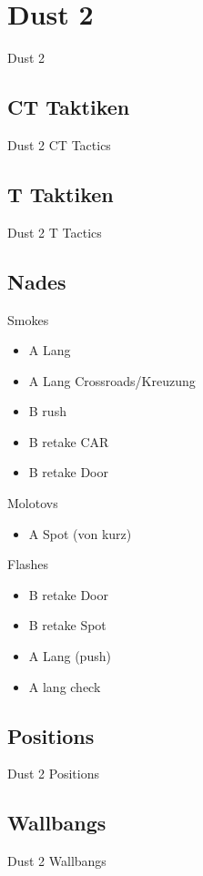 \newpage




\chapter{Dust 2}
\label{chap:dust2}
Dust 2

\section{CT Taktiken}
\label{sect:dust2_ct}
Dust 2 CT Tactics

\section{T Taktiken}
\label{sect:dust2_t}
Dust 2 T Tactics

\section{Nades}
\label{sect:dust2_nades}
Smokes
\begin{itemize}
\item A Lang
\item A Lang Crossroads/Kreuzung
\item B rush
\item B retake CAR
\item B retake Door
\end{itemize}

Molotovs
\begin{itemize}
\item A Spot (von kurz)
\end{itemize}

Flashes
\begin{itemize}
\item B retake Door
\item B retake Spot
\item A Lang (push)
\item A lang check
\end{itemize}

\section{Positions}
\label{sect:dust2_positions}
Dust 2 Positions

\section{Wallbangs}
\label{sect:dust2_wallbangs}
Dust 2 Wallbangs
